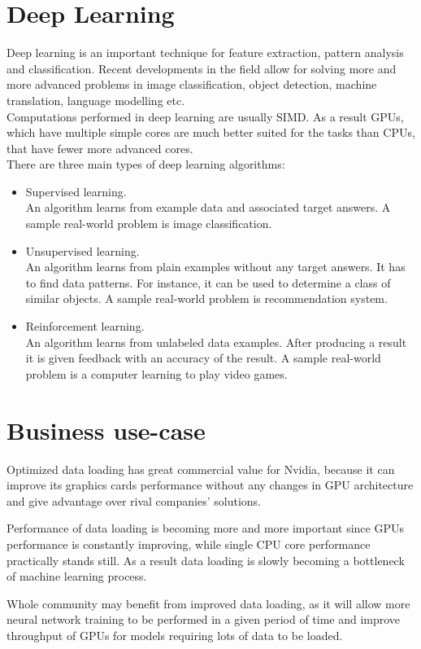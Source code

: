 \documentclass[licencjacka,en]{pracamgr}
\begin{document}
\section*{Deep Learning}
Deep learning is an important technique for feature extraction, pattern analysis and classification. Recent developments in the field allow for solving more and more advanced problems in image classification, object detection, machine translation, language modelling etc. \\
Computations performed in deep learning are usually SIMD. As a result GPUs, which have multiple simple cores are much better suited for the tasks than CPUs, that have fewer more advanced cores. \\
There are three main types of deep learning algorithms:
\begin{itemize}
\item Supervised learning. \\
An algorithm learns from example data and associated target answers. A sample real-world problem is image classification.
\item Unsupervised learning. \\
An algorithm learns from plain examples without any target answers. It has to find data patterns. For instance, it can be used to determine a class of similar objects. A sample real-world problem is recommendation system.
\item Reinforcement learning. \\
An algorithm learns from unlabeled data examples. After producing a result it is given feedback with an accuracy of the result. A sample real-world problem is a computer learning to play video games.
\end{itemize}

\section*{Business use-case}
Optimized data loading has great commercial value for Nvidia, because it can improve its graphics cards performance without any changes in GPU architecture and give advantage over rival companies’ solutions.

Performance of data loading is becoming more and more important since GPUs performance is constantly improving, while single CPU core performance practically stands still. As a result data loading is slowly becoming a bottleneck of machine learning process.

Whole community may benefit from improved data loading, as it will allow more neural network training to be performed in a given period of time and improve throughput of GPUs for models requiring lots of data to be loaded.
\end{document}
